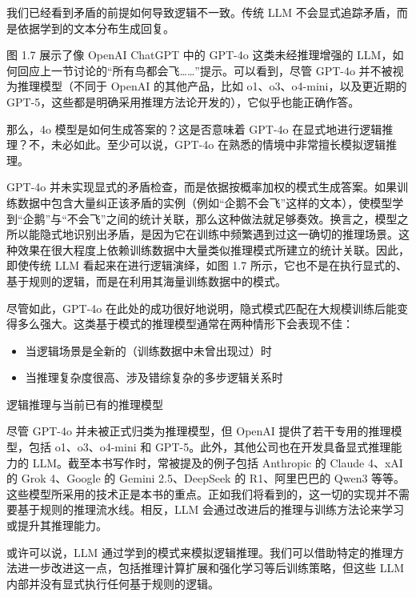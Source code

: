 我们已经看到矛盾的前提如何导致逻辑不一致。传统 LLM 不会显式追踪矛盾，而是依据学到的文本分布生成回复。

图 1.7 展示了像 OpenAI ChatGPT 中的 GPT-4o 这类未经推理增强的 LLM，如何回应上一节讨论的“所有鸟都会飞……”提示。可以看到，尽管 GPT-4o 并不被视为推理模型（不同于 OpenAI 的其他产品，比如 o1、o3、o4-mini，以及更近期的 GPT-5，这些都是明确采用推理方法论开发的），它似乎也能正确作答。


那么，4o 模型是如何生成答案的？这是否意味着 GPT-4o 在显式地进行逻辑推理？不，未必如此。至少可以说，GPT-4o 在熟悉的情境中非常擅长模拟逻辑推理。

GPT-4o 并未实现显式的矛盾检查，而是依据按概率加权的模式生成答案。如果训练数据中包含大量纠正该矛盾的实例（例如“企鹅不会飞”这样的文本），使模型学到“企鹅”与“不会飞”之间的统计关联，那么这种做法就足够奏效。换言之，模型之所以能隐式地识别出矛盾，是因为它在训练中频繁遇到过这一确切的推理场景。这种效果在很大程度上依赖训练数据中大量类似推理模式所建立的统计关联。因此，即使传统 LLM 看起来在进行逻辑演绎，如图 1.7 所示，它也不是在执行显式的、基于规则的逻辑，而是在利用其海量训练数据中的模式。

尽管如此，GPT-4o 在此处的成功很好地说明，隐式模式匹配在大规模训练后能变得多么强大。这类基于模式的推理模型通常在两种情形下会表现不佳：

\begin{itemize}
\item 当逻辑场景是全新的（训练数据中未曾出现过）时
\item 当推理复杂度很高、涉及错综复杂的多步逻辑关系时
\end{itemize}

\begin{mySidebar}{逻辑推理与当前已有的推理模型}

尽管 GPT-4o 并未被正式归类为推理模型，但 OpenAI 提供了若干专用的推理模型，包括 o1、o3、o4-mini 和 GPT-5。此外，其他公司也在开发具备显式推理能力的 LLM。截至本书写作时，常被提及的例子包括 Anthropic 的 Claude 4、xAI 的 Grok 4、Google 的 Gemini 2.5、DeepSeek 的 R1、阿里巴巴的 Qwen3 等等。这些模型所采用的技术正是本书的重点。正如我们将看到的，这一切的实现并不需要基于规则的推理流水线。相反，LLM 会通过改进后的推理与训练方法论来学习或提升其推理能力。

\end{mySidebar}

或许可以说，LLM 通过学到的模式来模拟逻辑推理。我们可以借助特定的推理方法进一步改进这一点，包括推理计算扩展和强化学习等后训练策略，但这些 LLM 内部并没有显式执行任何基于规则的逻辑。

